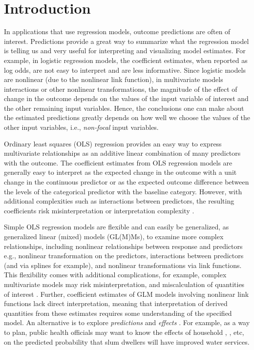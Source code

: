 
\linenumbers

\section{Introduction}


In applications that use regression models, outcome predictions are often of interest. Predictions provide a great way to summarize what the regression model is telling us and very useful for interpreting and visualizing model estimates. For example, in logistic regression models, the coefficient estimates, when reported as log odds, are not easy to interpret and are less informative. Since logistic models are nonlinear (due to the nonlinear link function), in multivariate models interactions or other nonlinear transformations, the magnitude of the effect of change in the outcome depends on the values of the input variable of interest and the other remaining input variables. Hence, the conclusions one can make about the estimated predictions greatly depends on how well we choose the values of the other input variables, i.e., \emph{non-focal} input variables.  

Ordinary least squares (OLS) regression provides an easy way to express multivariate relationships as an additive linear combination of many predictors with the outcome. The coefficient estimates from OLS regression models are generally easy to interpret as the expected change in the outcome with a unit change in the continuous predictor or as the expected outcome difference between the levels of the categorical predictor with the baseline category. However, with additional complexities such as interactions between predictors, the resulting coefficients risk misinterpretation or interpretation complexity \citep{brambor_understanding_2006, berry_improving_2012}. 

Simple OLS regression models are flexible and can easily be generalized, as generalized linear (mixed) models (GL(M)Ms), to examine more complex relationships, including nonlinear relationships between response and predictors e.g., nonlinear transformation on the predictors, interactions between predictors (and via splines for example), and nonlinear transformations via link functions. This flexibility comes with additional complications, for example, complex multivariate models may risk misinterpretation, and miscalculation of quantities of interest \citep{berry_improving_2012, leeper2017interpreting}. Further, coefficient estimates of GLM models involving nonlinear link functions lack direct interpretation\citep{leeper2017interpreting}, meaning that interpretation of derived quantities from these estimates requires some understanding of the specified model. An alternative is to explore \emph{predictions} and \emph{effects} \citep{fox2009effect, leeper2017package, lenth2018package}.  For example, as a way to plan, public health officials may want to know the effects of household , , etc, on the predicted probability that slum dwellers will have improved water services. 

